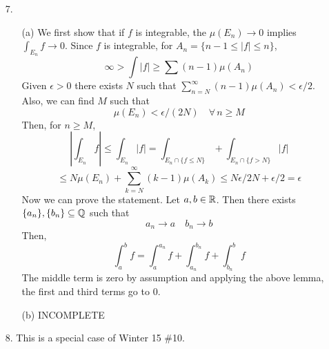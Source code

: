 \begin{itemize}
\item[7.] \begin{itemize}
		\item[(a)] We first show that if $f$ is integrable, the $\mu(E_n) \to 0$ implies $\int_{E_n} f \to 0$. Since $f$ is integrable, for $A_n = \{ n-1 \le |f| \le n \}$,
		\[ \infty > \int |f| \ge \sum (n-1)\mu(A_n) \]
		Given $\epsilon >0$ there exists $N$ such that $\sum_{n=N}^\infty (n-1) \mu(A_n) < \epsilon/2$. Also, we can find $M$ such that 
		\[ \mu(E_n) < \epsilon/(2N) \quad \forall \, n \ge M \]
		Then, for $n \ge M$,
		\[ \left|\int_{E_n} f\right| \le \int_{E_n} |f| = \int_{E_n \cap \{f \le N \} } + \int_{E_n \cap \{f > N\}} |f| \]
		\[\le N\mu(E_n) + \sum_{k=N}^\infty (k-1)\mu(A_k) \le N\epsilon/2N + \epsilon /2 = \epsilon \]
		Now we can prove the statement. Let $a,b \in \mathbb{R}$. Then there exists $\{a_n\},\{b_n\} \subseteq \mathbb{Q}$ such that
		\[ a_n \to a \quad b_n \to b \]
		Then,
		\[ \int_a^b f = \int_a^{a_n}f + \int_{a_n}^{b_n}f + \int_{b_n}^bf \]
		The middle term is zero by assumption and applying the above lemma, the first and third terms go to 0.
		\item[(b)] INCOMPLETE
	\end{itemize}

\item[8.] This is a special case of Winter 15 \#10.
\end{itemize}